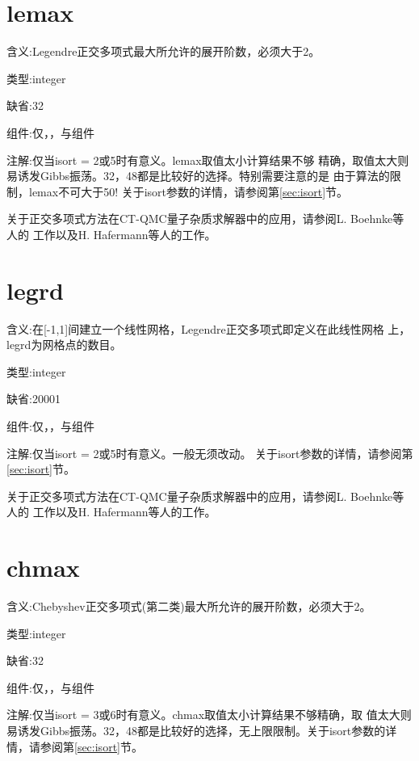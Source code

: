 \section{lemax }
\label{sec:lemax}

{\color{red}含义}:Legendre正交多项式最大所允许的展开阶数，必须大于2。

{\color{green}类型}:integer

{\color{blue}缺省}:32

{\color{brown}组件}:仅{\gardenia}，{\narcissus}，与{\lavender}组件

{\color{purple}注解}:仅当isort = 2或5时有意义。lemax取值太小计算结果不够
精确，取值太大则易诱发Gibbs振荡。32，48都是比较好的选择。特别需要注意的是
由于算法的限制，lemax不可大于50! 关于isort参数的详情，请参阅第\ref{sec:isort}节。

关于正交多项式方法在CT-QMC量子杂质求解器中的应用，请参阅L. Boehnke等人的
工作\cite{ortho:075145}以及H. Hafermann等人的工作\cite{hh:2011}。

\section{legrd }
\label{sec:legrd}

{\color{red}含义}:在[-1,1]间建立一个线性网格，Legendre正交多项式即定义在此线性网格
上，legrd为网格点的数目。

{\color{green}类型}:integer

{\color{blue}缺省}:20001

{\color{brown}组件}:仅{\gardenia}，{\narcissus}，与{\lavender}组件

{\color{purple}注解}:仅当isort = 2或5时有意义。一般无须改动。
关于isort参数的详情，请参阅第\ref{sec:isort}节。

关于正交多项式方法在CT-QMC量子杂质求解器中的应用，请参阅L. Boehnke等人的
工作\cite{ortho:075145}以及H. Hafermann等人的工作\cite{hh:2011}。

\section{chmax }
\label{sec:chmax}

{\color{red}含义}:Chebyshev正交多项式(第二类)最大所允许的展开阶数，必须大于2。

{\color{green}类型}:integer

{\color{blue}缺省}:32

{\color{brown}组件}:仅{\gardenia}，{\narcissus}，与{\lavender}组件

{\color{purple}注解}:仅当isort = 3或6时有意义。chmax取值太小计算结果不够精确，取
值太大则易诱发Gibbs振荡。32，48都是比较好的选择，无上限限制。关于isort参数的详
情，请参阅第\ref{sec:isort}节。

